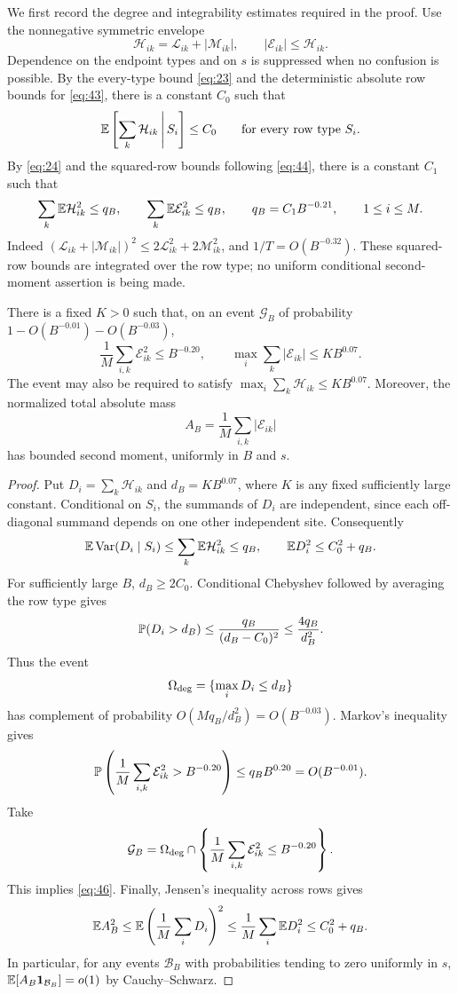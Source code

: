 We first record the degree and integrability estimates required in
the proof.  Use the nonnegative symmetric envelope
\[
 \mathcal H_{ik}=\mathcal L_{ik}+|\mathcal M_{ik}|,
 \qquad |\mathcal E_{ik}|\le\mathcal H_{ik}.
\]
Dependence on the endpoint types and on $s$ is suppressed when no
confusion is possible.  By the every-type bound \eqref{eq:23} and
the deterministic absolute row bounds for \eqref{eq:43}, there is
a constant $C_0$ such that
\[
 \mathbb E\left[\sum_k\mathcal H_{ik}\,\middle|\,S_i\right]\le C_0
       \qquad\text{for every row type }S_i.
\]
By \eqref{eq:24} and the squared-row bounds following
\eqref{eq:44}, there is a constant $C_1$ such that
\[
 \sum_k\mathbb E\mathcal H_{ik}^2\le q_B,
 \qquad
 \sum_k\mathbb E\mathcal E_{ik}^2\le q_B,
 \qquad q_B=C_1B^{-0.21},
       \qquad 1\le i\le M.
\]
Indeed $(\mathcal L_{ik}+|\mathcal M_{ik}|)^2
\le2\mathcal L_{ik}^2+2\mathcal M_{ik}^2$, and
$1/T=O(B^{-0.32})$.  These squared-row bounds are integrated over
the row type; no uniform conditional second-moment assertion is
being made.

\begin{lemma}
\label{lem:sampling-good}
There is a fixed $K>0$ such that, on an event $\mathcal G_B$ of
probability $1-O(B^{-0.01})-O(B^{-0.03})$,
\begin{equation}
 \frac1M\sum_{i,k}\mathcal E_{ik}^2\le B^{-0.20},
 \qquad
 \max_i\sum_k|\mathcal E_{ik}|\le K B^{0.07}.
 \label{eq:46}
\end{equation}
The event may also be required to satisfy
$\max_i\sum_k\mathcal H_{ik}\le K B^{0.07}$.
Moreover, the normalized total absolute mass
\[
 A_B=\frac1M\sum_{i,k}|\mathcal E_{ik}|
\]
has bounded second moment, uniformly in $B$ and $s$.
\end{lemma}

\begin{proof}
Put $D_i=\sum_k\mathcal H_{ik}$ and $d_B=K B^{0.07}$,
where $K$ is any fixed sufficiently large constant.  Conditional
on $S_i$, the summands of $D_i$ are independent, since each
off-diagonal summand depends on one other independent site.
Consequently
\[
 \mathbb E\operatorname{Var}(D_i\mid S_i)
 \le\sum_k\mathbb E\mathcal H_{ik}^2\le q_B,
 \qquad
 \mathbb E D_i^2\le C_0^2+q_B.
\]
For sufficiently large $B$, $d_B\ge2C_0$.  Conditional Chebyshev
followed by averaging the row type gives
\[
 \mathbb P(D_i>d_B)
 \le\frac{q_B}{(d_B-C_0)^2}
 \le\frac{4q_B}{d_B^2}.
\]
Thus the event
\[
 \Omega_{\rm deg}
   =\{\max_iD_i\le d_B\}
\]
has complement of probability
$O(Mq_B/d_B^2)=O(B^{-0.03})$.
Markov's inequality gives
\[
 \mathbb P\left(\frac1M\sum_{i,k}\mathcal E_{ik}^2>B^{-0.20}\right)
       \le q_B B^{0.20}=O(B^{-0.01}).
\]
Take
\[
 \mathcal G_B=\Omega_{\rm deg}\cap
   \left\{\frac1M\sum_{i,k}\mathcal E_{ik}^2\le B^{-0.20}\right\}.
\]
This implies \eqref{eq:46}.
Finally, Jensen's inequality across rows gives
\[
 \mathbb E A_B^2
 \le\mathbb E\left(\frac1M\sum_iD_i\right)^2
 \le\frac1M\sum_i\mathbb E D_i^2
 \le C_0^2+q_B.
\]
In particular, for any events $\mathcal B_B$ with probabilities
tending to zero uniformly in $s$,
$\mathbb E[A_B\mathbf 1_{\mathcal B_B}]=o(1)$ by Cauchy--Schwarz.
\end{proof}

